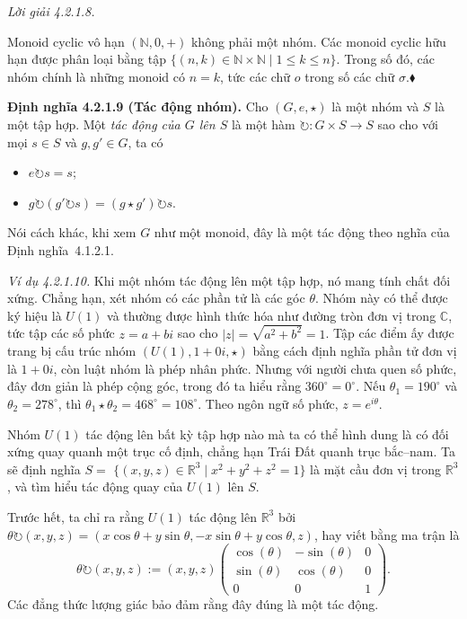 \noindent\textit{Lời giải 4.2.1.8.}\keepwithnext

Monoid cyclic vô hạn $(\mathbb{N},0,+)$ không phải một nhóm. Các monoid cyclic hữu hạn được phân loại bằng tập $\{(n,k)\in\mathbb{N}\times\mathbb{N}\mid1\le k\le n\}$. Trong số đó, các nhóm chính là những monoid có $n=k$, tức các chữ $o$ trong số các chữ $\sigma$.\hfill$\blacklozenge$

\noindent\textbf{Định nghĩa 4.2.1.9 (Tác động nhóm).} Cho $(G,e,\star)$ là một nhóm và $S$ là một tập hợp. Một \emph{tác động của $G$ lên $S$} là một hàm $\circlearrowright:G\times S\to S$ sao cho với mọi $s\in S$ và $g,g'\in G$, ta có
\begin{itemize}
\item $e\circlearrowright s=s$;
\item $g\circlearrowright(g'\circlearrowright s)=(g\star g')\circlearrowright s$.
\end{itemize}
Nói cách khác, khi xem $G$ như một monoid, đây là một tác động theo nghĩa của Định nghĩa~4.1.2.1.

\noindent\textit{Ví dụ 4.2.1.10.} Khi một nhóm tác động lên một tập hợp, nó mang tính chất đối xứng. Chẳng hạn, xét nhóm có các phần tử là các góc $\theta$. Nhóm này có thể được ký hiệu là $U(1)$ và thường được hình thức hóa như đường tròn đơn vị trong $\mathbb{C}$, tức tập các số phức $z=a+bi$ sao cho $|z|=\sqrt{a^2+b^2}=1$. Tập các điểm ấy được trang bị cấu trúc nhóm $(U(1),1+0i,\star)$ bằng cách định nghĩa phần tử đơn vị là $1+0i$, còn luật nhóm là phép nhân phức. Nhưng với người chưa quen số phức, đây đơn giản là phép cộng góc, trong đó ta hiểu rằng $360^\circ=0^\circ$. Nếu $\theta_1=190^\circ$ và $\theta_2=278^\circ$, thì $\theta_1\star\theta_2=468^\circ=108^\circ$. Theo ngôn ngữ số phức, $z=e^{i\theta}$.

Nhóm $U(1)$ tác động lên bất kỳ tập hợp nào mà ta có thể hình dung là có đối xứng quay quanh một trục cố định, chẳng hạn Trái Đất quanh trục bắc--nam. Ta sẽ định nghĩa $S=$
$\{(x,y,z)\in\mathbb{R}^3\mid x^2+y^2+z^2=1\}$ là mặt cầu đơn vị trong $\mathbb{R}^3$, và tìm hiểu tác động quay của $U(1)$ lên $S$.

Trước hết, ta chỉ ra rằng $U(1)$ tác động lên $\mathbb{R}^3$ bởi $\theta\circlearrowright(x,y,z)=(x\cos\theta+y\sin\theta,-x\sin\theta+y\cos\theta,z)$, hay viết bằng ma trận là
\[
\theta\circlearrowright(x,y,z):=(x,y,z)
\begin{pmatrix}
\cos(\theta)&-\sin(\theta)&0\\
\sin(\theta)&\cos(\theta)&0\\
0&0&1
\end{pmatrix}.
\]
Các đẳng thức lượng giác bảo đảm rằng đây đúng là một tác động.

